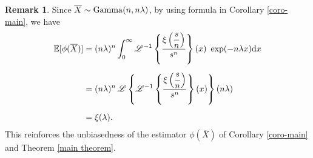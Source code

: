 \documentclass[12pt]{article}
\theoremstyle{definition}
\newtheorem{remark}[theorem]{Remark}
\begin{document}
\begin{remark}
	Since $\overline{X}\sim{\rm Gamma}(n,n\lambda)$, by using formula in Corollary \ref{coro-main}, we have
	\begin{align*}
		\mathbb{E}[\phi(\overline{X})]
		&=
		{(n\lambda)^n}
		\int_0^\infty 
		\mathscr{L}^{-1}\left\{	
		{\displaystyle \xi\left({s\over n}\right)\over s^n}
		\right\}
		(x) \
		\exp(-n\lambda x)
		{\rm d}x
		\\[0,2cm]
		&=
		{(n\lambda)^n} \,
		\mathscr{L}\left\{
		\mathscr{L}^{-1}\left\{	
		{\displaystyle \xi\left({s\over n}\right)\over s^n}
		\right\}
		(x)
		\right\}(n\lambda)
		\\[0,2cm]
		&=
		\xi(\lambda).
	\end{align*}
	This reinforces the unbiasedness of the estimator $\phi(\overline{X})$ of Corollary \ref{coro-main} and Theorem \ref{main theorem}.
\end{remark}
\end{document}
